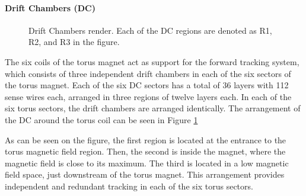 \paragraph{Drift Chambers (DC)}
    \begin{figure}
        \centering{}
        \caption[DC]{Drift Chambers render.
        Each of the DC regions are denoted as R1, R2, and R3 in the figure.}
        \label{fig::dc}
    \end{figure}

    The six coils of the torus magnet act as support for the forward tracking system, which consists of three independent drift chambers in each of the six sectors of the torus magnet.
    Each of the six DC sectors has a total of 36 layers with 112 sense wires each, arranged in three regions of twelve layers each.
    In each of the six torus sectors, the drift chambers are arranged identically.
    The arrangement of the DC around the torus coil can be seen in Figure \ref{fig::dc}

    As can be seen on the figure, the first region is located at the entrance to the torus magnetic field region.
    Then, the second is inside the magnet, where the magnetic field is close to its maximum.
    The third is located in a low magnetic field space, just downstream of the torus magnet.
    This arrangement provides independent and redundant tracking in each of the six torus sectors.

